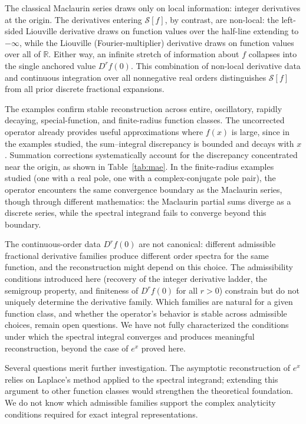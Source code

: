 \documentclass[preprint, 12pt]{elsarticle}
\theoremstyle{definition}
\theoremstyle{plain}
\theoremstyle{remark}
\begin{document}
The classical Maclaurin series draws only on local information: integer derivatives at the origin. The derivatives entering $\mathcal{S}[f]$, by contrast, are non-local: the left-sided Liouville derivative draws on function values over the half-line extending to $-\infty$, while the Liouville (Fourier-multiplier) derivative draws on function values over all of $\mathbb R$. Either way, an infinite stretch of information about $f$ collapses into the single anchored value $D^r f(0)$. This combination of non-local derivative data and continuous integration over all nonnegative real orders distinguishes $\mathcal{S}[f]$ from all prior discrete fractional expansions.

The examples confirm stable reconstruction across entire, oscillatory, rapidly decaying, special-function, and finite-radius function classes. The uncorrected operator already provides useful approximations where $f(x)$ is large, since in the examples studied, the sum--integral discrepancy is bounded and decays with $x$. Summation corrections systematically account for the discrepancy concentrated near the origin, as shown in Table~\ref{tab:mae}. In the finite-radius examples studied (one with a real pole, one with a complex-conjugate pole pair), the operator encounters the same convergence boundary as the Maclaurin series, though through different mathematics: the Maclaurin partial sums diverge as a discrete series, while the spectral integrand fails to converge beyond this boundary.

The continuous-order data $D^r f(0)$ are not canonical: different admissible fractional derivative families produce different order spectra for the same function, and the reconstruction might depend on this choice. The admissibility conditions introduced here (recovery of the integer derivative ladder, the semigroup property, and finiteness of $D^r f(0)$ for all $r>0$) constrain but do not uniquely determine the derivative family. Which families are natural for a given function class, and whether the operator's behavior is stable across admissible choices, remain open questions. We have not fully characterized the conditions under which the spectral integral converges and produces meaningful reconstruction, beyond the case of $e^x$ proved here.

Several questions merit further investigation. The asymptotic reconstruction of $e^x$ relies on Laplace's method applied to the spectral integrand; extending this argument to other function classes would strengthen the theoretical foundation. We do not know which admissible families support the complex analyticity conditions required for exact integral representations.
\end{document}
